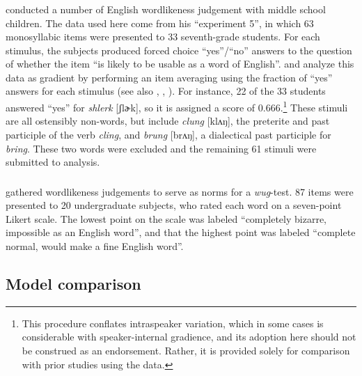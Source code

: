\subsubsection{\citealt{Scholes1966}}

\citet{Scholes1966} conducted a number of English wordlikeness judgement with middle school children. The data used here come from his ``experiment 5'', in which 63 monosyllabic items were presented to 33 seventh-grade students. For each stimulus, the subjects produced forced choice ``yes''/``no'' answers to the question of whether the item ``is likely to be usable as a word of English''. \citet{Hayes2008a} and \citet{Albright2009a} analyze this data as gradient by performing an item averaging using the fraction of ``yes'' answers for each stimulus (see also \citealt{Pierrehumbert1994}, \citealt{Coleman1997}, \citealt{Frisch2000}). For instance, 22 of the 33 students answered ``yes'' for \emph{shlerk} [ʃlɚk], so it is assigned a score of $0.666$.\footnote{This procedure conflates intraspeaker variation, which in some cases is considerable \citep{Shademan2007} with speaker-internal gradience, and its adoption here should not be construed as an endorsement. Rather, it is provided solely for comparison with prior studies using the \citeauthor{Scholes1966} data.} These stimuli are all ostensibly non-words, but include \emph{clung} [klʌŋ], the preterite and past participle of the verb \emph{cling}, and \emph{brung} [brʌŋ], a dialectical past participle for \emph{bring}. These two words were excluded and the remaining 61 stimuli were submitted to analysis. 

\subsubsection{\citealt{Albright2003b}}

\citet{Albright2003b} gathered wordlikeness judgements to serve as norms for a \emph{wug}-test. 87 items were presented to 20 undergraduate subjects, who rated each word on a seven-point Likert scale. The lowest point on the scale was labeled ``completely bizarre, impossible as an English word'', and that the highest point was labeled ``complete normal, would make a fine English word''.

\subsection{Model comparison}

